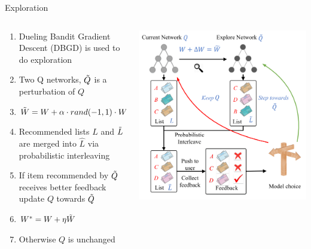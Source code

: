 \begin{frame}{Exploration}
\begin{columns}
\begin{column}{0.7\textwidth}
   \begin{enumerate}
       \item Dueling Bandit Gradient Descent (DBGD) is used to do exploration
       \item Two Q networks, $\Tilde{Q}$ is a perturbation of $Q$
       \item $\Tilde{W} = W + \alpha \cdot rand(-1,1) \cdot W$
       \item Recommended lists $L$ and $\Tilde{L}$ are merged into $\hat{L}$ via probabilistic interleaving
       \item If item recommended by $\Tilde{Q}$ receives better feedback update $Q$ towards $\Tilde{Q}$
       \item $W^* = W + \eta\Tilde{W}$
       \item Otherwise $Q$ is unchanged
   \end{enumerate}
\end{column}
\begin{column}{0.3\textwidth} 
    \begin{center}
     \includegraphics[scale=0.2]{DeepinScreenshot_select-area_20200514225903.png}
     \end{center}
\end{column}
\end{columns}
\end{frame}


